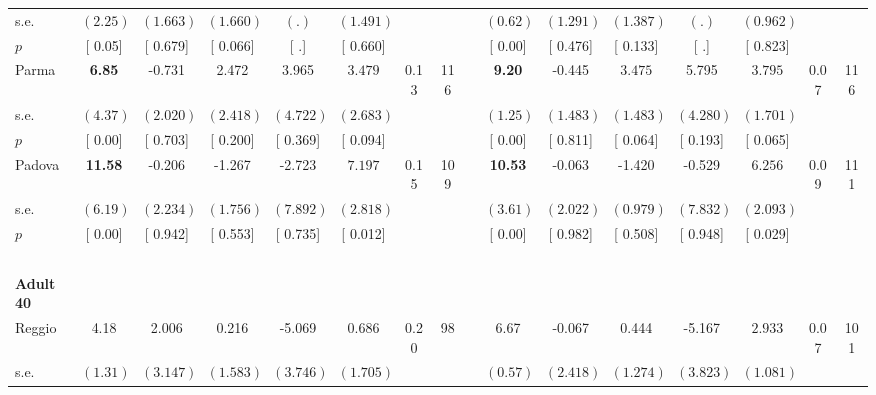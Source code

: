 \begin{longtable}{L{8em} c c c c c c c p{1em} c c c c c c c}
\quad \quad \quad \quad s.e.& $ (     2.25)$ & $ (    1.663)$ & $ (    1.660)$ & $ (        .)$ & $ (    1.491)$ & & & & $ (     0.62)$ & $ (    1.291)$ & $ (    1.387)$ & $ (        .)$ & $ (    0.962)$ & &  \\*
\quad \quad \quad \quad $ p$ & [     0.05] & [    0.679] & [    0.066] & [        .] & [    0.660] & & & & [     0.00] & [    0.476] & [    0.133] & [        .] & [    0.823] & &  \\[1em]
\quad \quad \quad Parma& \textbf{     6.85} &    -0.731 &     2.472 &     3.965 & $ \mathbf{    3.479}$ &      0.13 &       116 & & \textbf{     9.20} &    -0.445 & $ \mathbf{    3.475}$ &     5.795 & $ \mathbf{    3.795}$ &      0.07 &       116  \\*
\quad \quad \quad \quad s.e.& $ (     4.37)$ & $ (    2.020)$ & $ (    2.418)$ & $ (    4.722)$ & $ (    2.683)$ & & & & $ (     1.25)$ & $ (    1.483)$ & $ (    1.483)$ & $ (    4.280)$ & $ (    1.701)$ & &  \\*
\quad \quad \quad \quad $ p$ & [     0.00] & [    0.703] & [    0.200] & [    0.369] & [    0.094] & & & & [     0.00] & [    0.811] & [    0.064] & [    0.193] & [    0.065] & &  \\[1em]
\quad \quad \quad Padova& \textbf{    11.58} &    -0.206 &    -1.267 &    -2.723 & $ \mathbf{    7.197}$ &      0.15 &       109 & & \textbf{    10.53} &    -0.063 &    -1.420 &    -0.529 & $ \mathbf{    6.256}$ &      0.09 &       111  \\*
\quad \quad \quad \quad s.e.& $ (     6.19)$ & $ (    2.234)$ & $ (    1.756)$ & $ (    7.892)$ & $ (    2.818)$ & & & & $ (     3.61)$ & $ (    2.022)$ & $ (    0.979)$ & $ (    7.832)$ & $ (    2.093)$ & &  \\*
\quad \quad \quad \quad $ p$ & [     0.00] & [    0.942] & [    0.553] & [    0.735] & [    0.012] & & & & [     0.00] & [    0.982] & [    0.508] & [    0.948] & [    0.029] & &  \\[1em]
~\\[1em]
\quad \quad \textbf{Adult 40} & & & & & & & & & & & & & & & \\* 
\quad \quad \quad Reggio& 4.18 &     2.006 &     0.216 &    -5.069 &     0.686 &      0.20 &        98 & & 6.67 &    -0.067 &     0.444 &    -5.167 & $ \mathbf{    2.933}$ &      0.07 &       101  \\*
\quad \quad \quad \quad s.e.& $ (     1.31)$ & $ (    3.147)$ & $ (    1.583)$ & $ (    3.746)$ & $ (    1.705)$ & & & & $ (     0.57)$ & $ (    2.418)$ & $ (    1.274)$ & $ (    3.823)$ & $ (    1.081)$ & &  \\*

\end{longtable}
